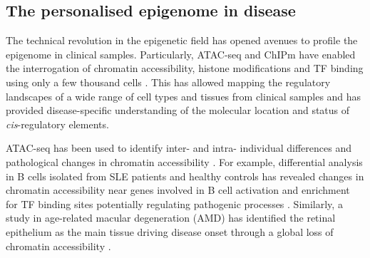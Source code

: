 

\subsection{The personalised epigenome in disease}

The technical revolution in the epigenetic field has opened avenues to profile the epigenome in clinical samples. Particularly, ATAC-seq and ChIPm have enabled the interrogation of chromatin accessibility, histone modifications and TF binding using only a few thousand cells \parencite{Buenrostro2013, Schmidl2015}. This has allowed mapping the regulatory landscapes of a wide range of cell types and tissues from clinical samples and has provided disease-specific understanding of the molecular location and status of \textit{cis}-regulatory elements. 


ATAC-seq has been used to identify inter- and intra- individual differences and pathological changes in chromatin accessibility \parencite{Qu2015}. For example, differential analysis in B cells isolated from SLE patients and healthy controls has revealed changes in chromatin accessibility near genes involved in B cell activation and enrichment for TF binding sites potentially regulating pathogenic processes \parencite{Scharer2016}. Similarly, a study in age-related macular degeneration (AMD) has identified the retinal epithelium as the main tissue driving disease onset through a global loss of chromatin accessibility \parencite{Wang2018}. %

